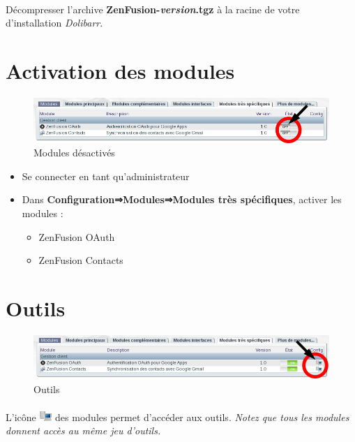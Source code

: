 \documentclass[12pt,a4paper,titlepage]{article}
\begin{document}
		\paragraph{}
		Décompresser l'archive \textbf{ZenFusion-\textit{version}.tgz} à la racine de votre d'installation \emph{Dolibarr}.

		\section{Activation des modules}
		
		\begin{figure}[h]
			\centering\includegraphics[scale=0.55]{activation1}
			\caption{Modules désactivés}
			\label{fig:act}
		\end{figure}	
	
		\begin{itemize}
			\item Se connecter en tant qu'administrateur
			\item Dans \textbf{Configuration⇒Modules⇒Modules très spécifiques}, activer les modules :
				\begin{itemize}
					\item ZenFusion OAuth
					\item ZenFusion Contacts
				\end{itemize}			
		\end{itemize}
	
	\section{Outils}
		
		\begin{figure}[h]
			\centering\includegraphics[scale=0.55]{conf1}
			\caption{Outils}
			\label{fig:conf}
		\end{figure}		
		
		\paragraph{}
		L'icône \includegraphics{setup} des modules permet d'accéder aux outils.
		\emph{Notez que tous les modules donnent accès au même jeu d'outils.}
		
\end{document}
